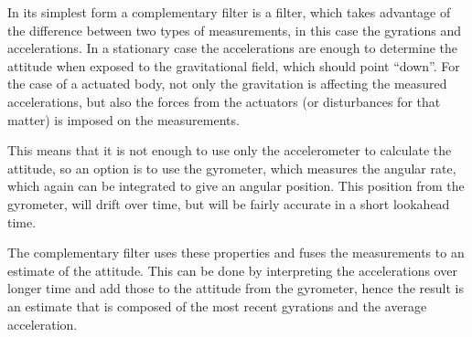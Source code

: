 In its simplest form a complementary filter is a filter, which takes
advantage of the difference between two types of measurements, in this
case the gyrations and accelerations. In a stationary case the
accelerations are enough to determine the attitude when exposed to the
gravitational field, which should point ``down''. For the case of a
actuated body, not only the gravitation is affecting the measured
accelerations, but also the forces from the actuators (or disturbances
for that matter) is imposed on the measurements.

This means that it is not enough to use only the accelerometer to
calculate the attitude, so an option is to use the gyrometer, which
measures the angular rate, which again can be integrated to give an
angular position. This position from the gyrometer, will drift over time,
but will be fairly accurate in a short lookahead time.

The complementary filter uses these properties and fuses the
measurements to an estimate of the attitude. This can be done by
interpreting the accelerations over longer time and add those to
the attitude from the gyrometer, hence the result is an estimate that is
composed of the most recent gyrations and the average acceleration.




